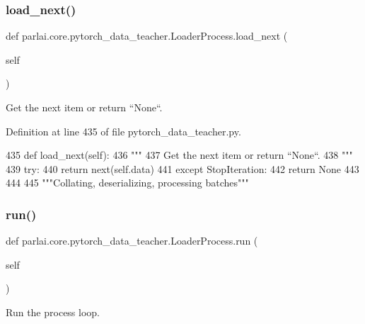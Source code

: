 \subsubsection{\texorpdfstring{load\+\_\+next()}{load\_next()}}
{\footnotesize\ttfamily def parlai.\+core.\+pytorch\+\_\+data\+\_\+teacher.\+Loader\+Process.\+load\+\_\+next (\begin{DoxyParamCaption}\item[{}]{self }\end{DoxyParamCaption})}

\begin{DoxyVerb}Get the next item or return ``None``.
\end{DoxyVerb}
 

Definition at line 435 of file pytorch\+\_\+data\+\_\+teacher.\+py.


\begin{DoxyCode}
435     \textcolor{keyword}{def }load\_next(self):
436         \textcolor{stringliteral}{"""}
437 \textcolor{stringliteral}{        Get the next item or return ``None``.}
438 \textcolor{stringliteral}{        """}
439         \textcolor{keywordflow}{try}:
440             \textcolor{keywordflow}{return} next(self.data)
441         \textcolor{keywordflow}{except} StopIteration:
442             \textcolor{keywordflow}{return} \textcolor{keywordtype}{None}
443 
444 
445 \textcolor{stringliteral}{"""Collating, deserializing, processing batches"""}
\end{DoxyCode}
\mbox{\label{classparlai_1_1core_1_1pytorch__data__teacher_1_1LoaderProcess_a741c7edb04daec4d8623987b3de4406a}} 
\subsubsection{\texorpdfstring{run()}{run()}}
{\footnotesize\ttfamily def parlai.\+core.\+pytorch\+\_\+data\+\_\+teacher.\+Loader\+Process.\+run (\begin{DoxyParamCaption}\item[{}]{self }\end{DoxyParamCaption})}

\begin{DoxyVerb}Run the process loop.
\end{DoxyVerb}
 

